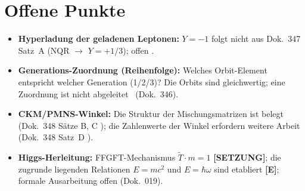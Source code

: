 \section{Offene Punkte}

\begin{itemize}
  \item \textbf{Hyperladung der geladenen Leptonen:} $Y = -1$ folgt
    nicht aus Dok.~347 Satz~A (NQR $\to$ $Y = +1/3$); offen \SM.
  \item \textbf{Generations-Zuordnung (Reihenfolge):} Welches
    Orbit-Element entspricht welcher Generation (1/2/3)?
    Die Orbits sind gleichwertig; eine Zuordnung ist nicht
    abgeleitet \SM\ (Dok.~346).
  \item \textbf{CKM/PMNS-Winkel:} Die Struktur der Mischungsmatrizen
    ist belegt (Dok.~348 Sätze B, C \BM); die Zahlenwerte der
    Winkel erfordern weitere Arbeit (Dok.~348 Satz~D \SM).
  \item \textbf{Higgs-Herleitung:} FFGFT-Mechanismus
    $\tilde{T} \cdot m = 1$ \textbf{[SETZUNG]}; die zugrunde liegenden Relationen $E=mc^2$ und $E=\hbar\omega$ sind etabliert \textbf{[E]};
    formale Ausarbeitung offen (Dok.~019).
\end{itemize}
